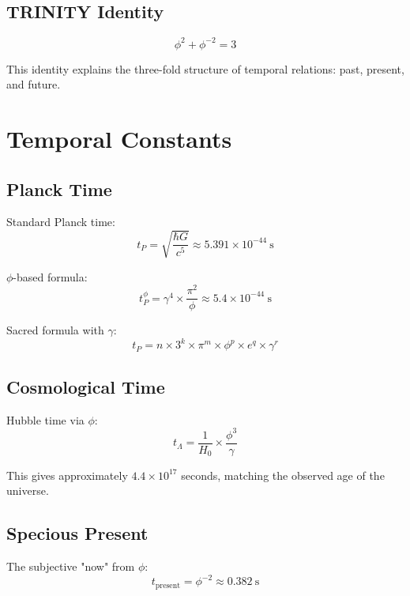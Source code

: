 \documentclass[12pt,a4paper]{article}
\begin{document}
\subsection{TRINITY Identity}

\begin{equation}
\phi^2 + \phi^{-2} = 3
\end{equation}

This identity explains the three-fold structure of temporal relations: past, present, and future.

\section{Temporal Constants}

\subsection{Planck Time}

Standard Planck time:
\begin{equation}
t_P = \sqrt{\frac{\hbar G}{c^5}} \approx 5.391 \times 10^{-44}~\text{s}
\end{equation}

$\phi$-based formula:
\begin{equation}
t_P^\phi = \gamma^4 \times \frac{\pi^2}{\phi} \approx 5.4 \times 10^{-44}~\text{s}
\end{equation}

Sacred formula with $\gamma$:
\begin{equation}
t_P = n \times 3^k \times \pi^m \times \phi^p \times e^q \times \gamma^r
\end{equation}

\subsection{Cosmological Time}

Hubble time via $\phi$:
\begin{equation}
t_\Lambda = \frac{1}{H_0} \times \frac{\phi^3}{\gamma}
\end{equation}

This gives approximately $4.4 \times 10^{17}$ seconds, matching the observed age of the universe.

\subsection{Specious Present}

The subjective "now" from $\phi$:
\begin{equation}
t_{\text{present}} = \phi^{-2} \approx 0.382~\text{s}
\end{equation}
\end{document}
